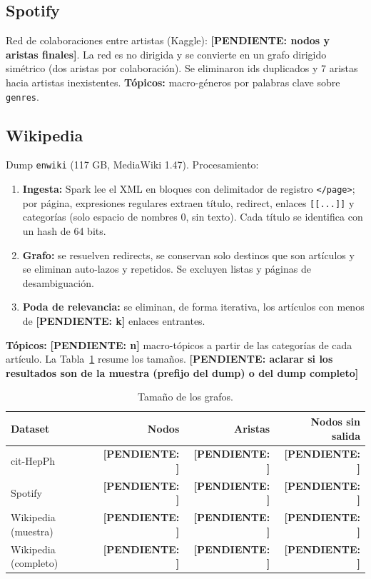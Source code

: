 \documentclass[11pt,a4paper]{article}
\newcommand{\pend}[1]{\textcolor{red!70!black}{\textbf{[PENDIENTE: #1]}}}
\begin{document}
\subsection{Spotify}
Red de colaboraciones entre artistas (Kaggle): \pend{nodos y aristas finales}. La red es no dirigida y se convierte en un grafo dirigido simétrico (dos aristas por colaboración). Se eliminaron ids duplicados y 7 aristas hacia artistas inexistentes. \textbf{Tópicos:} macro-géneros por palabras clave sobre \texttt{genres}.

\subsection{Wikipedia}
Dump \texttt{enwiki} (117 GB, MediaWiki 1.47). Procesamiento:
\begin{enumerate}
  \item \textbf{Ingesta:} Spark lee el XML en bloques con delimitador de registro \texttt{</page>}; por página, expresiones regulares extraen título, redirect, enlaces \texttt{[[...]]} y categorías (solo espacio de nombres 0, sin texto). Cada título se identifica con un hash de 64 bits.
  \item \textbf{Grafo:} se resuelven redirects, se conservan solo destinos que son artículos y se eliminan auto-lazos y repetidos. Se excluyen listas y páginas de desambiguación.
  \item \textbf{Poda de relevancia:} se eliminan, de forma iterativa, los artículos con menos de \pend{k} enlaces entrantes.
\end{enumerate}
\textbf{Tópicos:} \pend{n} macro-tópicos a partir de las categorías de cada artículo. La Tabla~\ref{tab:tamanos} resume los tamaños. \pend{aclarar si los resultados son de la muestra (prefijo del dump) o del dump completo}

\begin{table}[h]
\centering
\caption{Tamaño de los grafos.}\label{tab:tamanos}
\begin{tabular}{lrrr}
\toprule
Dataset & Nodos & Aristas & Nodos sin salida\\
\midrule
cit-HepPh & \pend{} & \pend{} & \pend{}\\
Spotify & \pend{} & \pend{} & \pend{}\\
Wikipedia (muestra) & \pend{} & \pend{} & \pend{}\\
Wikipedia (completo) & \pend{} & \pend{} & \pend{}\\
\bottomrule
\end{tabular}
\end{table}
\end{document}
